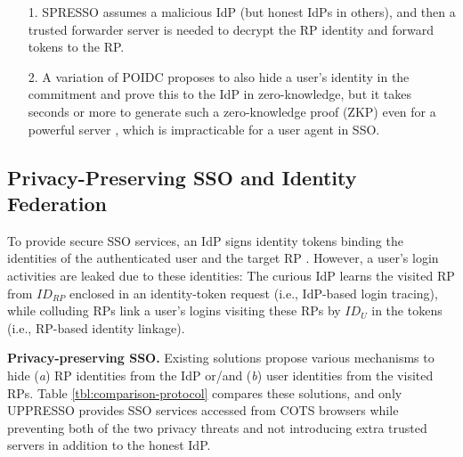 \begin{table*}[tb]
{\begin{itemize}
\item[1.]
SPRESSO assumes a malicious IdP (but honest IdPs in others), and then a trusted forwarder server is needed to decrypt the RP identity and forward tokens to the RP.

\item[2.]
A variation of POIDC \cite{POIDC} proposes to also hide a user's identity in the commitment and prove this to the IdP in zero-knowledge,
        but it takes seconds or more to generate such a zero-knowledge proof (ZKP) even for a powerful server \cite{ZKP-BINF,zkp-benchmark,ZKP-GPU},
        which is impracticable for a user agent in SSO.
%
\end{itemize}}
\end{table*}

\subsection{Privacy-Preserving SSO and Identity Federation}
\label{subsec-solutions}
To provide secure SSO services,
    an IdP signs identity tokens binding the identities of the authenticated user and the target RP \cite{OpenIDConnect,rfc6749}.
However,
    a user's login activities are leaked due to these identities:
        The curious IdP learns the visited RP from $ID_{RP}$ enclosed in an identity-token request (i.e., IdP-based login tracing),
        while colluding RPs link a user's logins visiting these RPs by $ID_{U}$ in the tokens (i.e., RP-based identity linkage).




\noindent\textbf{Privacy-preserving SSO.}
Existing solutions propose various mechanisms to hide (\emph{a}) RP identities from the IdP or/and (\emph{b}) user identities from the visited RPs.
Table \ref{tbl:comparison-protocol} compares these solutions,
and only UPPRESSO provides SSO services accessed from COTS browsers while preventing both of the two privacy threats and not introducing extra trusted servers in addition to the honest IdP.


